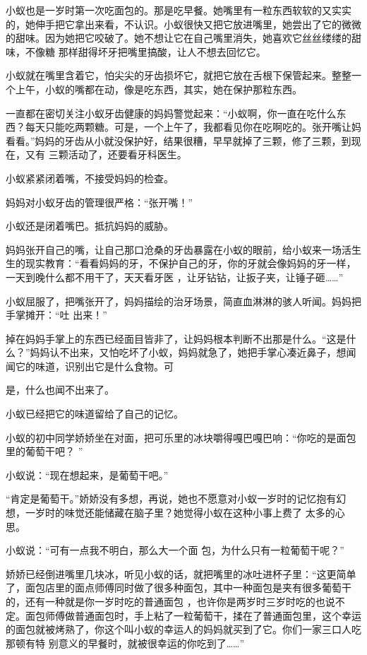 \documentclass{article}
\begin{document}
小蚁也是一岁时第一次吃面包的。那是吃早餐。她嘴里有一粒东西软软的又实实的，她伸手把它拿出来看，不认识。小蚁很快又把它放进嘴里，她尝出了它的微微的甜味。因为她把它咬破了。她不想让它在自己嘴里消失，她喜欢它丝丝缕缕的甜味，不像糖
那样甜得坏牙把嘴里搞酸，让人不想去回忆它。 

小蚁就在嘴里含着它，怕尖尖的牙齿损坏它，就把它放在舌根下保管起来。整整一个上午，小蚁的嘴都在动，像是吃东西，其实，她在保护那粒东西。

一直都在密切关注小蚁牙齿健康的妈妈警觉起来：“小蚁啊，你一直在吃什么东西？每天只能吃两颗糖。可是，一个上午了，我都看见你在吃啊吃的。张开嘴让妈看看。”妈妈的牙齿从小就没保护好，结果很糟，早早就掉了三颗，修了三颗，到现在，又有
三颗活动了，还要看牙科医生。 

\newpage


小蚁紧紧闭着嘴，不接受妈妈的检查。 

妈妈对小蚁牙齿的管理很严格：“张开嘴！”


小蚁还是闭着嘴巴。抵抗妈妈的威胁。 

妈妈张开自己的嘴，让自己那口沧桑的牙齿暴露在小蚁的眼前，给小蚁来一场活生生的现实教育：“看看妈妈的牙，不保护自己的牙，你的牙就会像妈妈的牙一样，一天到晚什么都不用干了，天天看牙医
，让牙钻钻，让扳子夹，让锤子砸……” 

小蚁屈服了，把嘴张开了，妈妈描绘的治牙场景，简直血淋淋的骇人听闻。妈妈把手掌摊开：“吐
出来！” 

掉在妈妈手掌上的东西已经面目皆非了，让妈妈根本判断不出那是什么。“这是什么？”妈妈认不出来，又怕吃坏了小蚁，妈妈就急了，她把手掌心凑近鼻子，想闻闻它的味道，识别出它是什么食物。可

\newpage
是，什么也闻不出来了。 


小蚁已经把它的味道留给了自己的记忆。 

小蚁的初中同学娇娇坐在对面，把可乐里的冰块嚼得嘎巴嘎巴响：“你吃的是面包里的葡萄干吧？
” 


小蚁说：“现在想起来，是葡萄干吧。” 

“肯定是葡萄干。”娇娇没有多想，再说，她也不愿意对小蚁一岁时的记忆抱有幻想，一岁时的味觉还能储藏在脑子里？她觉得小蚁在这种小事上费了
太多的心思。 

小蚁说：“可有一点我不明白，那么大一个面
包，为什么只有一粒葡萄干呢？” 

娇娇已经倒进嘴里几块冰，听见小蚁的话，就把嘴里的冰吐进杯子里：“这更简单了，面包店里的面点师傅同时做了很多种面包，其中一种面包是夹有很多葡萄干的，还有一种就是你一岁时吃的普通面包
\newpage
，也许你是两岁时三岁时吃的也说不定。面包师傅做普通面包时，手上粘了一粒葡萄干，揉在了普通面包里，这个幸运的面包就被烤熟了，你这个叫小蚁的幸运人的妈妈就买到了它。你们一家三口人吃那顿有特
别意义的早餐时，就被很幸运的你吃到了……” 
\end{document}
